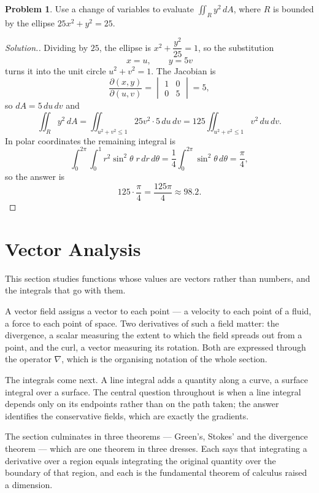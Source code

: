 \documentclass[11pt,a4paper]{article}
\theoremstyle{definition}
\newtheorem{problemx}{Problem}[subsection]
\newenvironment{problem}{\begin{problemx}}{\end{problemx}}
\newenvironment{solution}
  {\renewcommand{\qedsymbol}{}\begin{proof}[\textit{Solution}.]}
  {\end{proof}}
\begin{document}
\begin{problem}
Use a change of variables to evaluate $\displaystyle{\iint_R y^2\,dA}$, where
$R$ is bounded by the ellipse $25x^2+y^2 = 25$.
\end{problem}
\begin{solution}
Dividing by $25$, the ellipse is $x^2+\dfrac{y^2}{25} = 1$, so the substitution
$$x = u,\qquad y = 5v$$
turns it into the unit circle $u^2+v^2 = 1$. The Jacobian is
$$\frac{\partial(x,y)}{\partial(u,v)}
= \begin{vmatrix}1 & 0\\ 0 & 5\end{vmatrix} = 5 ,$$
so $dA = 5\,du\,dv$ and
$$\iint_R y^2\,dA = \iint_{u^2+v^2\leq 1}25v^2\cdot 5\,du\,dv
= 125\iint_{u^2+v^2\leq 1}v^2\,du\,dv .$$
In polar coordinates the remaining integral is
$$\int_0^{2\pi}\int_0^1 r^2\sin^2\theta\;r\,dr\,d\theta
= \frac14\int_0^{2\pi}\sin^2\theta\,d\theta = \frac{\pi}{4},$$
so the answer is
$$125\cdot\frac{\pi}{4} = \frac{125\pi}{4}\approx 98.2 .$$
\end{solution}


{\color[wave]{485}\section{Vector Analysis}}

This section studies functions whose values are vectors rather than numbers, and
the integrals that go with them.

A vector field assigns a vector to each point --- a velocity to each point of a
fluid, a force to each point of space. Two derivatives of such a field matter:
the divergence, a scalar measuring the extent to which the field spreads out from
a point, and the curl, a vector measuring its rotation. Both are expressed
through the operator $\nabla$, which is the organising notation of the whole
section.

The integrals come next. A line integral adds a quantity along a curve, a
surface integral over a surface. The central question throughout is when a line
integral depends only on its endpoints rather than on the path taken; the answer
identifies the conservative fields, which are exactly the gradients.

The section culminates in three theorems --- Green's, Stokes' and the divergence
theorem --- which are one theorem in three dresses. Each says that integrating a
derivative over a region equals integrating the original quantity over the
boundary of that region, and each is the fundamental theorem of calculus raised
a dimension.
\end{document}
